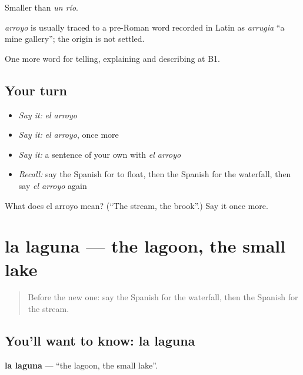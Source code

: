 Smaller than \emph{un río}.

\begin{cousinweb}
\emph{arroyo} is usually traced to a pre-Roman word recorded in Latin as \emph{arrugia} \textquotedblleft{}a mine gallery\textquotedblright{}; the origin is not settled.
\end{cousinweb}

\begin{grammarlens}[title={What you've built}]
One more word for telling, explaining and describing at B1.
\end{grammarlens}

\subsection*{Your turn}
\begin{itemize}
\raggedright
  \item \emph{Say it:} \emph{el arroyo}
  \item \emph{Say it:} \emph{el arroyo}, once more
  \item \emph{Say it:} a sentence of your own with \emph{el arroyo}
  \item \emph{Recall:} say the Spanish for to float, then the Spanish for the waterfall, then say \emph{el arroyo} again
\end{itemize}

\begin{tcolorbox}[breakable,colback=teal!4,colframe=teal!35!black,title={Before you move on}]
What does el arroyo mean? (\textquotedblleft{}The stream, the brook\textquotedblright{}.) Say it once more.
\end{tcolorbox}
\section[la laguna]{la laguna — the lagoon, the small lake}

\label{lesson:ES-C689-laguna}



\begin{quote}
Before the new one: say the Spanish for the waterfall, then the Spanish for the stream.
\end{quote}

\subsection*{You'll want to know: la laguna}
\textbf{la laguna} — \textquotedblleft{}the lagoon, the small lake\textquotedblright{}.

